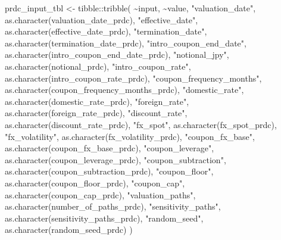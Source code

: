 \documentclass[
  letterpaper,
  DIV=11,
  numbers=noendperiod]{scrreprt}
\newenvironment{Shaded}{\begin{snugshade}}{\end{snugshade}}
\newcommand{\FunctionTok}[1]{\textcolor[rgb]{0.28,0.35,0.67}{#1}}
\newcommand{\NormalTok}[1]{\textcolor[rgb]{0.00,0.23,0.31}{#1}}
\newcommand{\OtherTok}[1]{\textcolor[rgb]{0.00,0.23,0.31}{#1}}
\newcommand{\SpecialCharTok}[1]{\textcolor[rgb]{0.37,0.37,0.37}{#1}}
\newcommand{\StringTok}[1]{\textcolor[rgb]{0.13,0.47,0.30}{#1}}
\begin{document}
\begin{Shaded}
\begin{Highlighting}[]
\NormalTok{prdc\_input\_tbl }\OtherTok{\textless{}{-}}\NormalTok{ tibble}\SpecialCharTok{::}\FunctionTok{tribble}\NormalTok{(}
  \SpecialCharTok{\textasciitilde{}}\NormalTok{input,                    }\SpecialCharTok{\textasciitilde{}}\NormalTok{value,}
  \StringTok{"valuation\_date"}\NormalTok{,           }\FunctionTok{as.character}\NormalTok{(valuation\_date\_prdc),}
  \StringTok{"effective\_date"}\NormalTok{,           }\FunctionTok{as.character}\NormalTok{(effective\_date\_prdc),}
  \StringTok{"termination\_date"}\NormalTok{,         }\FunctionTok{as.character}\NormalTok{(termination\_date\_prdc),}
  \StringTok{"intro\_coupon\_end\_date"}\NormalTok{,    }\FunctionTok{as.character}\NormalTok{(intro\_coupon\_end\_date\_prdc),}
  \StringTok{"notional\_jpy"}\NormalTok{,             }\FunctionTok{as.character}\NormalTok{(notional\_prdc),}
  \StringTok{"intro\_coupon\_rate"}\NormalTok{,        }\FunctionTok{as.character}\NormalTok{(intro\_coupon\_rate\_prdc),}
  \StringTok{"coupon\_frequency\_months"}\NormalTok{,  }\FunctionTok{as.character}\NormalTok{(coupon\_frequency\_months\_prdc),}
  \StringTok{"domestic\_rate"}\NormalTok{,            }\FunctionTok{as.character}\NormalTok{(domestic\_rate\_prdc),}
  \StringTok{"foreign\_rate"}\NormalTok{,             }\FunctionTok{as.character}\NormalTok{(foreign\_rate\_prdc),}
  \StringTok{"discount\_rate"}\NormalTok{,            }\FunctionTok{as.character}\NormalTok{(discount\_rate\_prdc),}
  \StringTok{"fx\_spot"}\NormalTok{,                  }\FunctionTok{as.character}\NormalTok{(fx\_spot\_prdc),}
  \StringTok{"fx\_volatility"}\NormalTok{,            }\FunctionTok{as.character}\NormalTok{(fx\_volatility\_prdc),}
  \StringTok{"coupon\_fx\_base"}\NormalTok{,           }\FunctionTok{as.character}\NormalTok{(coupon\_fx\_base\_prdc),}
  \StringTok{"coupon\_leverage"}\NormalTok{,          }\FunctionTok{as.character}\NormalTok{(coupon\_leverage\_prdc),}
  \StringTok{"coupon\_subtraction"}\NormalTok{,       }\FunctionTok{as.character}\NormalTok{(coupon\_subtraction\_prdc),}
  \StringTok{"coupon\_floor"}\NormalTok{,             }\FunctionTok{as.character}\NormalTok{(coupon\_floor\_prdc),}
  \StringTok{"coupon\_cap"}\NormalTok{,               }\FunctionTok{as.character}\NormalTok{(coupon\_cap\_prdc),}
  \StringTok{"valuation\_paths"}\NormalTok{,          }\FunctionTok{as.character}\NormalTok{(number\_of\_paths\_prdc),}
  \StringTok{"sensitivity\_paths"}\NormalTok{,        }\FunctionTok{as.character}\NormalTok{(sensitivity\_paths\_prdc),}
  \StringTok{"random\_seed"}\NormalTok{,              }\FunctionTok{as.character}\NormalTok{(random\_seed\_prdc)}
\NormalTok{)}


\end{Highlighting}
\end{Shaded}
\end{document}
